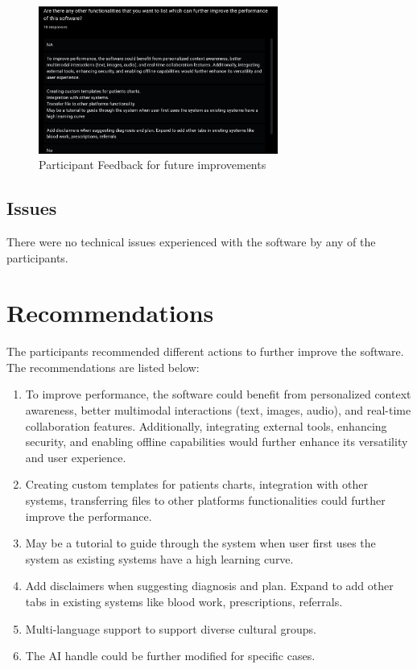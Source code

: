 \documentclass{article}
\begin{document}
\begin{figure}[h]
    \centering
    \includegraphics[width=0.7\textwidth]{Improvements.png}
    \caption{Participant Feedback for future improvements}
    \label{FigUH}
\end{figure}

\subsection{Issues}

There were no technical issues experienced with the software by any of the participants.

\newpage

\section{Recommendations}

The participants recommended different actions to further improve the software. The recommendations are listed below:

\begin{enumerate}
    \item To improve performance, the software could benefit from personalized context awareness, better multimodal interactions (text, images, audio), and real-time collaboration features. Additionally, integrating external tools, enhancing security, and enabling offline capabilities would further enhance its versatility and user experience.
    \item Creating custom templates for patients charts, integration with other systems, transferring files to other platforms functionalities could further improve the performance.
    \item May be a tutorial to guide through the system when user first uses the system as existing systems have a high learning curve.
    \item Add disclaimers when suggesting diagnosis and plan. Expand to add other tabs in existing systems like blood work, prescriptions, referrals.
    \item Multi-language support to support diverse cultural groups.
    \item The AI handle could be further modified for specific cases.
\end{enumerate}
\end{document}
